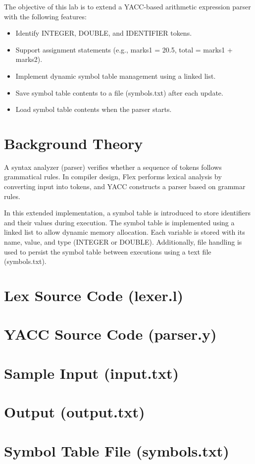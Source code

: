 \documentclass[12pt,a4paper]{article}
\begin{document}
The objective of this lab is to extend a YACC-based arithmetic expression parser with the following features:
\begin{itemize}
    \item Identify INTEGER, DOUBLE, and IDENTIFIER tokens.
    \item Support assignment statements (e.g., marks1 = 20.5, total = marks1 + marks2).
    \item Implement dynamic symbol table management using a linked list.
    \item Save symbol table contents to a file (symbols.txt) after each update.
    \item Load symbol table contents when the parser starts.
\end{itemize}


\section{Background Theory}

A syntax analyzer (parser) verifies whether a sequence of tokens follows grammatical rules. In compiler design, Flex performs lexical analysis by converting input into tokens, and YACC constructs a parser based on grammar rules.

In this extended implementation, a symbol table is introduced to store identifiers and their values during execution. The symbol table is implemented using a linked list to allow dynamic memory allocation. Each variable is stored with its name, value, and type (INTEGER or DOUBLE). Additionally, file handling is used to persist the symbol table between executions using a text file (symbols.txt).


\appendix

\section{Lex Source Code (lexer.l)}


\section{YACC Source Code (parser.y)}


\section{Sample Input (input.txt)}


\section{Output (output.txt)}


\section{Symbol Table File (symbols.txt)}

\end{document}
